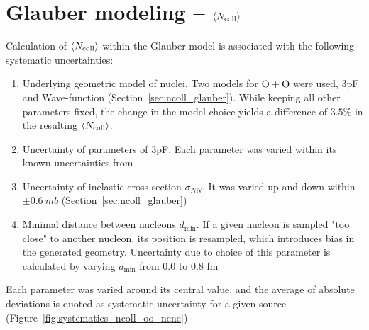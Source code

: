 \section{Glauber modeling -- $\langle N_{\text{coll}}\rangle$}
Calculation of $\langle N_{\text{coll}}\rangle$ within the Glauber model is associated with the following systematic uncertainties:
\begin{enumerate}
    \item Underlying geometric model of nuclei. Two models for $\OO$ were used, 3pF and Wave-function (Section~\ref{sec:ncoll_glauber}). While keeping all other parameters fixed, the change in the model choice yields a difference of $3.5\%$ in the resulting $\langle N_{\text{coll}}\rangle$.
    \item Uncertainty of parameters of 3pF. Each parameter was varied within its known uncertainties from \cite{DEVRIES1987495}
    \item Uncertainty of inelastic cross section $\sigma_{NN}$. It was varied up and down within $\pm\qty{0.6}{mb}$ (Section~\ref{sec:ncoll_glauber})
    \item Minimal distance between nucleons $d_\text{min}$. If a given nucleon is sampled "too close" to another nucleon, its position is resampled, which introduces bias in the generated geometry. Uncertainty due to choice of this parameter is calculated by varying $d_\text{min}$ from 0.0 to 0.8 fm \cite{PhysRevC.97.054910}
\end{enumerate}
Each parameter was varied around its central value, and the average of absolute deviations is quoted as systematic uncertainty for a given source (Figure~\ref{fig:systematics_ncoll_oo_nene})
